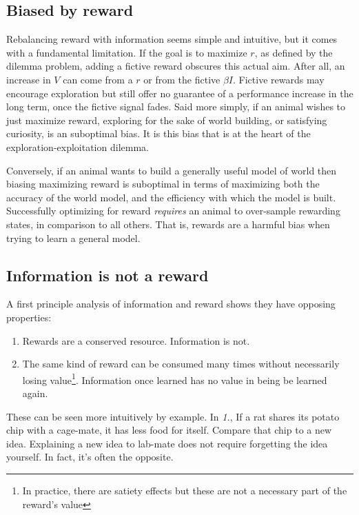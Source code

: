 \documentclass[9pt,twocolumn,twoside]{pnas-new}
\begin{document}
\subsection*{Biased by reward}
Rebalancing reward with information seems simple and intuitive, but it comes with a fundamental limitation. If the goal is to maximize $r$, as defined by the dilemma problem, adding a fictive reward obscures this actual aim. After all, an increase in $V$ can come from a $r$ or from the fictive $\beta I$. Fictive rewards may encourage exploration but still offer no guarantee of a performance increase in the long term, once the fictive signal fades. Said more simply, if an animal wishes to just maximize reward, exploring for the sake of world building, or satisfying curiosity, is an suboptimal bias. It is this bias that is at the heart of the exploration-exploitation dilemma.

Conversely, if an animal wants to build a generally useful model of world then biasing maximizing reward is suboptimal in terms of maximizing both the accuracy of the world model, and the efficiency with which the model is built. Successfully optimizing for reward \textit{requires} an animal to over-sample rewarding states, in comparison to all others. That is, rewards are a harmful bias when trying to learn a general model.


\subsection*{Information is not a reward}
A first principle analysis of information and reward shows they have opposing properties:

\begin{enumerate}
    \item Rewards are a conserved resource. Information is not. 
    \item The same kind of reward can be consumed many times without necessarily losing value\footnote{In practice, there are satiety effects but these are not a necessary part of the reward's value}. Information once learned has no value in being be learned again.
\end{enumerate}

These can be seen more intuitively by example. In \textit{1.}, If a rat shares its potato chip with a cage-mate, it has less food for itself. Compare that chip to a new idea. Explaining a new idea to lab-mate does not require forgetting the idea yourself. In fact, it's often the opposite.
\end{document}
